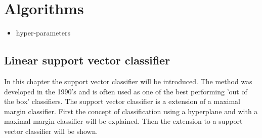 \section{Algorithms}
\begin{itemize}
\item{hyper-parameters}
\end{itemize}
\subsection{Linear support vector classifier}
In this chapter the support vector classifier will be introduced. The method was developed in the 1990’s and is often used as one of the best performing 'out of the box' classifiers. The support vector classifier is a extension of a maximal margin classifier. First  the concept of classification using a hyperplane and with a maximal margin classifier will be explained. Then the extension to a support vector classifier will be shown.

